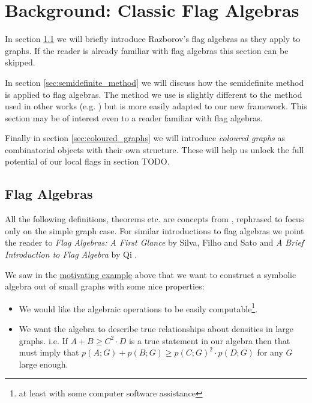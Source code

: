 \chapter{Background: Classic Flag Algebras}
\label{chap:classic_flags}

In section \ref{sec:flag_algebras} we will briefly introduce Razborov's
flag algebras as they apply to
graphs. If the reader is already familiar with flag algebras this section can be skipped.

In section \ref{sec:semidefinite_method} we will discuss how the semidefinite method is applied
to flag algebras.
The method we use is slightly different to the method used in other works
(e.g. \cite{silvaFlagAlgebrasFirst2016}) but is more easily adapted to our new framework. This
section may be of interest even to a reader familiar with flag algebras.

Finally in section \ref{sec:coloured_graphs} we will introduce \textit{coloured graphs} as combinatorial
objects with their own structure. These will help us unlock the full potential of
our local flags in section TODO.

\section{Flag Algebras}
\label{sec:flag_algebras}

All the following definitions, theorems etc.
are concepts from \cite{razborovFlagAlgebras2007}, rephrased
to focus only on the simple graph case.
For similar introductions to flag algebras we point the reader to
\textit{Flag Algebras: A First Glance} by Silva, Filho and Sato
\cite{silvaFlagAlgebrasFirst2016} and \textit{A Brief Introduction to Flag Algebra} by Qi
\cite{qiBriefIntroductionFlag}.

We saw in the \hyperref[sec:motivating_example]{motivating example} above that we want
to construct a symbolic algebra out of small graphs with some nice properties:
\begin{itemize}
    \item We would like the algebraic operations
        to be easily computable\footnote{at least with some computer software assistance}.
    \item We want the algebra to describe true relationships about densities in large graphs.
        i.e. If $A + B \geq C^2\cdot D$ is a true statement in our algebra
        then that must imply that $p(A; G) + p(B; G) \geq p(C; G)^2 \cdot p(D; G)$ for any $G$ large
        enough.
\end{itemize}

